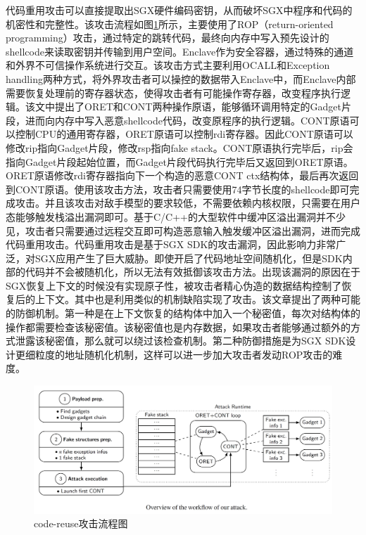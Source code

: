 \documentclass{source/Paper}
\begin{document}
        代码重用攻击\cite{biondo2018guard}可以直接提取出SGX硬件编码密钥，从而破坏SGX中程序和代码的机密性和完整性。该攻击流程如图\ref{codereuse}所示，主要使用了ROP（return-oriented programming）攻击，通过特定的跳转代码，最终向内存中写入预先设计的shellcode来读取密钥并传输到用户空间。Enclave作为安全容器，通过特殊的通道和外界不可信操作系统进行交互。该攻击方式主要利用OCALL和Exception handling两种方式，将外界攻击者可以操控的数据带入Enclave中，而Enclave内部需要恢复处理前的寄存器状态，使得攻击者有可能操作寄存器，改变程序执行逻辑。该文中提出了ORET和CONT两种操作原语，能够循环调用特定的Gadget片段，进而向内存中写入恶意shellcode代码，改变原程序的执行逻辑。CONT原语可以控制CPU的通用寄存器，ORET原语可以控制rdi寄存器。因此CONT原语可以修改rip指向Gadget片段，修改rsp指向fake stack。CONT原语执行完毕后，rip会指向Gadget片段起始位置，而Gadget片段代码执行完毕后又返回到ORET原语。ORET原语修改rdi寄存器指向下一个构造的恶意CONT ctx结构体，最后再次返回到CONT原语。使用该攻击方法，攻击者只需要使用74字节长度的shellcode即可完成攻击。并且该攻击对敌手模型的要求较低，不需要依赖内核权限，只需要在用户态能够触发栈溢出漏洞即可。基于C/C++的大型软件中缓冲区溢出漏洞并不少见，攻击者只需要通过远程交互即可构造恶意输入触发缓冲区溢出漏洞，进而完成代码重用攻击。代码重用攻击是基于SGX SDK的攻击漏洞，因此影响力非常广泛，对SGX应用产生了巨大威胁。即使开启了代码地址空间随机化，但是SDK内部的代码并不会被随机化，所以无法有效抵御该攻击方法。出现该漏洞的原因在于SGX恢复上下文的时候没有实现原子性，被攻击者精心伪造的数据结构控制了恢复后的上下文。其中\cite{cui2021smashex,jang2017hacking}也是利用类似的机制缺陷实现了攻击。该文章提出了两种可能的防御机制。第一种是在上下文恢复的结构体中加入一个秘密值，每次对结构体的操作都需要检查该秘密值。该秘密值也是内存数据，如果攻击者能够通过额外的方式泄露该秘密值，那么就可以绕过该检查机制。第二种防御措施是为SGX SDK设计更细粒度的地址随机化机制，这样可以进一步加大攻击者发动ROP攻击的难度。

        \begin{figure}[H]
            \includegraphics[width=1\linewidth]{pic/attack.jpg}
            \caption{code-reuse攻击流程图}
            \label{codereuse}
        \end{figure}
\end{document}
